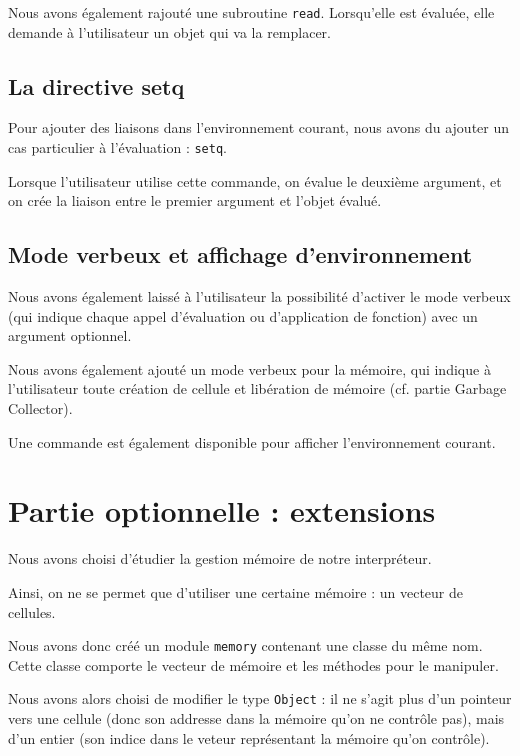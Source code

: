\documentclass[12pt]{article}
\begin{document}
Nous avons également rajouté une subroutine \texttt{read}. Lorsqu'elle est évaluée, elle demande à l'utilisateur un objet qui va la remplacer.

\subsection{La directive setq}

Pour ajouter des liaisons dans l'environnement courant, nous avons du ajouter un cas particulier à l'évaluation : \texttt{setq}. 

Lorsque l'utilisateur utilise cette commande, on évalue le deuxième argument, et on crée la liaison entre le premier argument et l'objet évalué.


\subsection{Mode verbeux et affichage d'environnement}

Nous avons également laissé à l'utilisateur la possibilité d'activer le mode verbeux (qui indique chaque appel d'évaluation ou d'application de fonction) avec un argument optionnel.

Nous avons également ajouté un mode verbeux pour la mémoire, qui indique à l'utilisateur toute création de cellule et libération de mémoire (cf. partie Garbage Collector).

Une commande est également disponible pour afficher l'environnement courant.


\section{Partie optionnelle : extensions}

Nous avons choisi d'étudier la gestion mémoire de notre interpréteur.

Ainsi, on ne se permet que d'utiliser une certaine mémoire : un vecteur de cellules.

Nous avons donc créé un module \texttt{memory} contenant une classe du même nom. Cette classe comporte le vecteur de mémoire et les méthodes pour le manipuler.

Nous avons alors choisi de modifier le type \texttt{Object} : il ne s'agit plus d'un pointeur vers une cellule (donc son addresse dans la mémoire qu'on ne contrôle pas), mais d'un entier (son indice dans le veteur représentant la mémoire qu'on contrôle).
\end{document}
